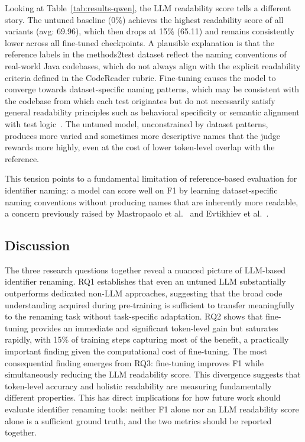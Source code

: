 \documentclass[conference]{IEEEtran}
\begin{document}
Looking at Table~\ref{tab:results-qwen}, the LLM readability score tells a
different story.
The untuned baseline (0\%) achieves the highest readability score of all
variants (avg: 69.96), which then drops at 15\% (65.11) and remains
consistently lower across all fine-tuned checkpoints.
A plausible explanation is that the reference labels in the methods2test dataset
reflect the naming conventions of real-world Java codebases, which do not always
align with the explicit readability criteria defined in the CodeReader rubric.
Fine-tuning causes the model to converge towards dataset-specific naming
patterns, which may be consistent with the codebase from which each test
originates but do not necessarily satisfy general readability principles such as
behavioral specificity or semantic alignment with test
logic~\cite{scalabrino2018readability,lin2019quality}.
The untuned model, unconstrained by dataset patterns, produces more varied and
sometimes more descriptive names that the judge rewards more highly, even at the
cost of lower token-level overlap with the reference.

This tension points to a fundamental limitation of reference-based evaluation
for identifier naming: a model can score well on F1 by learning dataset-specific
naming conventions without producing names that are inherently more readable, a
concern previously raised by Mastropaolo et al.~\cite{mastropaolo2023renaming}
and Evtikhiev et al.~\cite{evtikhiev2023bleu}.

\subsection{Discussion}

The three research questions together reveal a nuanced picture of LLM-based
identifier renaming.
RQ1 establishes that even an untuned LLM substantially outperforms dedicated
non-LLM approaches, suggesting that the broad code understanding acquired during
pre-training is sufficient to transfer meaningfully to the renaming task without
task-specific adaptation.
RQ2 shows that fine-tuning provides an immediate and significant token-level
gain but saturates rapidly, with 15\% of training steps capturing most of the
benefit, a practically important finding given the computational cost of
fine-tuning.
The most consequential finding emerges from RQ3: fine-tuning improves F1 while
simultaneously reducing the LLM readability score.
This divergence suggests that token-level accuracy and holistic readability are
measuring fundamentally different properties.
This has direct implications for how future work should evaluate identifier
renaming tools: neither F1 alone nor an LLM readability score alone is a
sufficient ground truth, and the two metrics should be reported together.
\end{document}
